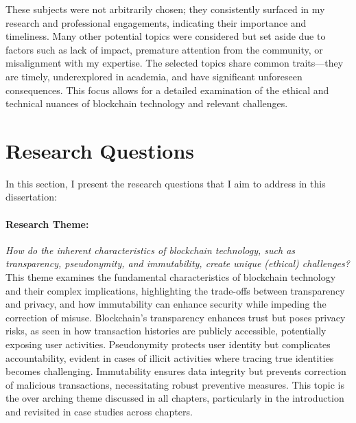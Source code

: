These subjects were not arbitrarily chosen; they consistently surfaced in my research and professional engagements, indicating their importance and timeliness. Many other potential topics were considered but set aside due to factors such as lack of impact, premature attention from the community, or misalignment with my expertise. The selected topics share common traits—they are timely, underexplored in academia, and have significant unforeseen consequences. This focus allows for a detailed examination of the ethical and technical nuances of blockchain technology and relevant challenges.



\section{Research Questions}\label{sec:research_questions}
In this section, I present the research questions that I aim to address in this dissertation:

\paragraph{Research Theme:} \textit{How do the inherent characteristics of blockchain technology, such as transparency, pseudonymity, and immutability, create unique (ethical) challenges?} 
This theme examines the fundamental characteristics of blockchain technology and their complex implications, highlighting the trade-offs between transparency and privacy, and how immutability can enhance security while impeding the correction of misuse. Blockchain's transparency enhances trust but poses privacy risks, as seen in how transaction histories are publicly accessible, potentially exposing user activities. Pseudonymity protects user identity but complicates accountability, evident in cases of illicit activities where tracing true identities becomes challenging. Immutability ensures data integrity but prevents correction of malicious transactions, necessitating robust preventive measures. This topic is the over arching theme discussed in all chapters, particularly in the introduction and revisited in case studies across chapters.

